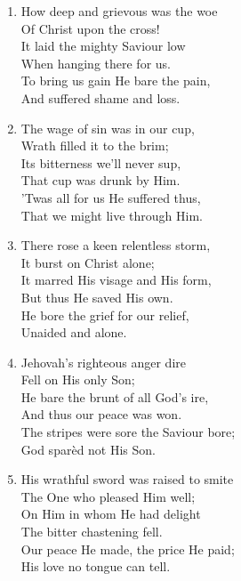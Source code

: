 \documentclass[11pt,a4paper]{article}
\begin{document}
\begin{enumerate}
    \item How deep and grievous was the woe \\
        Of Christ upon the cross! \\
        It laid the mighty Saviour low \\
        When hanging there for us. \\
        To bring us gain He bare the pain, \\
        And suffered shame and loss.

    \item The wage of sin was in our cup, \\
        Wrath filled it to the brim; \\
        Its bitterness we'll never sup, \\
        That cup was drunk by Him. \\
        'Twas all for us He suffered thus, \\
        That we might live through Him.

    \item There rose a keen relentless storm, \\
        It burst on Christ alone; \\
        It marred His visage and His form, \\
        But thus He saved His own. \\
        He bore the grief for our relief, \\
        Unaided and alone.

    \item Jehovah's righteous anger dire \\
        Fell on His only Son; \\
        He bare the brunt of all God's ire, \\
        And thus our peace was won. \\
        The stripes were sore the Saviour bore; \\
        God spar\`ed not His Son.

    \item His wrathful sword was raised to smite \\
        The One who pleased Him well; \\
        On Him in whom He had delight \\
        The bitter chastening fell. \\
        Our peace He made, the price He paid; \\
        His love no tongue can tell.


\end{enumerate}
\end{document}
